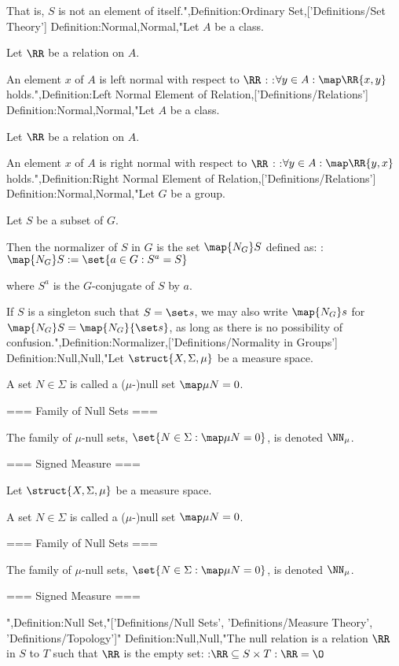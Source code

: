 That is,  $S$ is not an element of itself.",Definition:Ordinary Set,['Definitions/Set Theory']
Definition:Normal,Normal,"Let $A$ be a class.

Let $\RR$ be a relation on $A$.


An element $x$ of $A$ is left normal with respect to $\RR$ :
:$\forall y \in A: \map \RR {x, y}$ holds.",Definition:Left Normal Element of Relation,['Definitions/Relations']
Definition:Normal,Normal,"Let $A$ be a class.

Let $\RR$ be a relation on $A$.


An element $x$ of $A$ is right normal with respect to $\RR$ :
:$\forall y \in A: \map \RR {y, x}$ holds.",Definition:Right Normal Element of Relation,['Definitions/Relations']
Definition:Normal,Normal,"Let $G$ be a group.

Let $S$ be a subset of $G$.


Then the normalizer of $S$ in $G$ is the set $\map {N_G} S$ defined as:
:$\map {N_G} S := \set {a \in G: S^a = S}$

where $S^a$ is the $G$-conjugate of $S$ by $a$.


If $S$ is a singleton such that $S = \set s$, we may also write $\map {N_G} s$ for $\map {N_G} S = \map {N_G} {\set s}$, as long as there is no possibility of confusion.",Definition:Normalizer,['Definitions/Normality in Groups']
Definition:Null,Null,"Let $\struct {X, \Sigma, \mu}$ be a measure space.

A set $N \in \Sigma$ is called a ($\mu$-)null set  $\map \mu N = 0$.




=== Family of Null Sets ===

The family of $\mu$-null sets, $\set {N \in \Sigma: \map \mu N = 0}$, is denoted $\NN_\mu$. 


=== Signed Measure ===

Let $\struct {X, \Sigma, \mu}$ be a measure space.

A set $N \in \Sigma$ is called a ($\mu$-)null set  $\map \mu N = 0$.




=== Family of Null Sets ===

The family of $\mu$-null sets, $\set {N \in \Sigma: \map \mu N = 0}$, is denoted $\NN_\mu$. 


=== Signed Measure ===

",Definition:Null Set,"['Definitions/Null Sets', 'Definitions/Measure Theory', 'Definitions/Topology']"
Definition:Null,Null,"The null relation is a relation $\RR$ in $S$ to $T$ such that $\RR$ is the empty set:
:$\RR \subseteq S \times T: \RR = \O$


